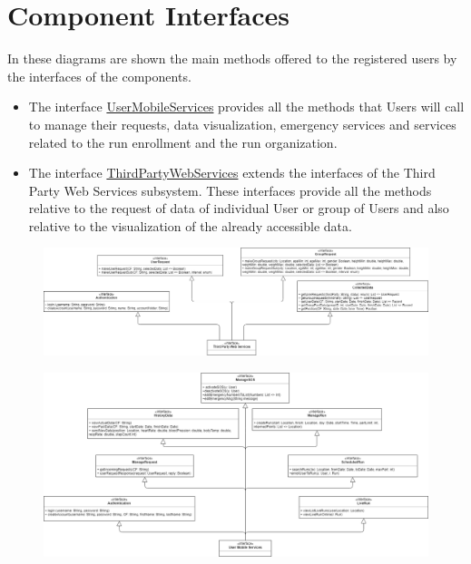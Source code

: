 \section{Component Interfaces}
In these diagrams are shown the main methods offered to the registered users by the interfaces of the components.

\begin{itemize}
    \item  The interface \underline{UserMobileServices} provides all the methods that Users will call to manage their requests, data visualization, emergency services and services related to the run enrollment and the run organization.
    \item The interface \underline{ThirdPartyWebServices} extends the interfaces of the Third Party Web Services subsystem. These interfaces provide all the methods relative to the request of data of individual User or group of Users and also relative to the visualization of the already accessible data.
   \end{itemize}

\begin{figure}[H]

    \centering
    \includegraphics[scale=0.32]{./Pictures/compInterfDiagThirdPDD.png}
   
\end{figure}

\begin{figure}[H]

    \centering
    \includegraphics[scale=0.35]{./Pictures/compInterfDiagUserDD.png}
   
\end{figure}

\newpage
